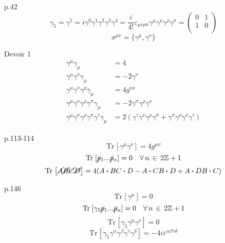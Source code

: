 \documentclass[12pt]{article}
\newcommand{\Z}{\mathbb{Z}}
\newcommand{\Tr}[1]{\mathrm{Tr}\hspace{1pt}\left[#1\right]}
\newcommand{\bdot}[0]{\boldsymbol{\cdot}}
\begin{document}
p.42 \\
\begin{equation}
  \gamma_5 = \gamma^5 = i\gamma^0\gamma^1\gamma^2\gamma^3\gamma^4 = \frac{i}{4!}\varepsilon_{\mu\nu\rho\sigma}\gamma^\mu\gamma^\nu\gamma^\rho\gamma^\sigma=\begin{pmatrix}0 & 1 \\ 1 & 0\\
\end{pmatrix}
\end{equation}
\begin{equation}
  \sigma^{\mu\nu} = \{\gamma^\mu,\gamma^\nu\}
\end{equation}

Devoir 1 \\
\begin{align}
  \gamma^\mu\gamma_\mu &= 4 \\
  \gamma^\mu\gamma^\nu\gamma_\mu &= -2\gamma^\nu \\
  \gamma^\mu\gamma^\nu\gamma^\rho\gamma_\mu &= 4g^{\nu\rho}\\
  \gamma^\mu\gamma^\nu\gamma^\rho\gamma^\sigma\gamma_\mu &= -2\gamma^\sigma\gamma^\rho\gamma^\nu\\
  \gamma^\mu\gamma^\nu\gamma^\rho\gamma^\sigma\gamma^\tau\gamma_\mu &= 2(\gamma^\tau\gamma^\nu\gamma^\rho\gamma^\sigma + \gamma^\sigma\gamma^\rho\gamma^\nu\gamma^\tau)
\end{align}

p.113-114 \\
\begin{equation}
  \Tr{\gamma^\mu\gamma^\nu} = 4g^{\mu\nu}
\end{equation}
\begin{equation}
  \Tr{\cancel{p}_1...\cancel{p}_n} = 0 \quad \forall\, n\, \in \, 2\Z+1
\end{equation}
\begin{equation}
  \Tr{\cancel{A}\cancel{B}\cancel{C}\cancel{D}} = 4(A\bdot B C \bdot D - A \bdot C B \bdot D + A \bdot D B \bdot C )
\end{equation}

p.146 \\
\begin{equation}
  \Tr{\gamma^\mu} = 0
\end{equation}
\begin{equation}
  \Tr{\gamma_5\cancel{p}_1...\cancel{p}_n} = 0 \quad \forall\, n\, \in \, 2\Z+1
\end{equation}
\begin{equation}
  \Tr{\gamma_5\gamma^\mu\gamma^\nu} = 0
\end{equation}
\begin{equation}
  \Tr{\gamma_5\gamma^\alpha\gamma^\beta\gamma^\gamma\gamma^\delta} = -4i\varepsilon^{\alpha\beta\gamma\delta}
\end{equation}
\end{document}
